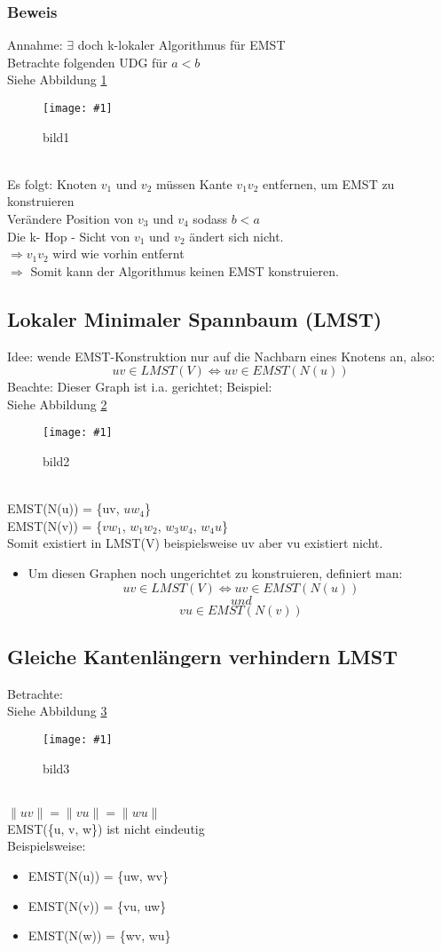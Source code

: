 \documentclass{article}
\newcommand{\bild}[4]{ %
	\begin{figure}[h!]
		\centering
		\texttt{[image: \#1]}
		\caption{#3}
		\label{#4}
	\end{figure}	
}
\newcommand{\sieheBild}[4]{
	Siehe Abbildung \ref{#4}
	\bild{#1}{#2}{#3}{#4}
}
\begin{document}
\subsubsection*{Beweis}
Annahme: $\exists$ doch k-lokaler Algorithmus für EMST\\
Betrachte folgenden UDG für $a < b$ \\
\sieheBild{Bilder/1.png}{0.7}{bild1}{Bild 1}
\\
Es folgt: Knoten $v_1$ und $v_2$ müssen Kante $v_1 v_2$ entfernen, um EMST zu konstruieren\\
Verändere Position von $v_3$ und $v_4$ sodass $b < a$\\
Die k- Hop - Sicht von $v_1$ und $v_2$ ändert sich nicht.\\
$\Rightarrow v_1 v_2$ wird wie vorhin entfernt \\
$\Rightarrow$ Somit kann der Algorithmus keinen EMST konstruieren.

\subsection*{Lokaler Minimaler Spannbaum (LMST)} 
Idee: wende EMST-Konstruktion nur auf die Nachbarn eines Knotens an, also: 
\[
	uv \in LMST(V) \Leftrightarrow uv \in EMST(N(u))
\]
Beachte: Dieser Graph ist i.a. gerichtet; Beispiel: 
\\
\sieheBild{Bilder/2.png}{0.4}{bild2}{Bild 2}
\\
EMST(N(u)) = \{uv, $uw_4$\}\\
EMST(N(v)) = \{$vw_1$, $w_1 w_2$, $w_3 w_4$, $w_4 u$\}
\\
Somit existiert in LMST(V) beispielsweise uv aber vu existiert nicht.
\begin{itemize}
	\item Um diesen Graphen noch ungerichtet zu konstruieren, definiert man: 
	\[
	uv \in LMST(V) \Leftrightarrow uv \in EMST(N(u))
	\]
	\[
	und
	\] 
	\[
	vu \in EMST(N(v))
	\]
\end{itemize}

\subsection*{Gleiche Kantenlängern verhindern LMST}
Betrachte: \\
\sieheBild{Bilder/3.png}{0.4}{bild3}{Bild 3}\\
$\|uv\| = \|vu\| = \|wu\|$
\\
EMST(\{u, v, w\}) ist nicht eindeutig
\\
Beispielsweise: 
\begin{itemize}
	\item EMST(N(u)) = \{uw, wv\}
	\item EMST(N(v)) = \{vu, uw\}
	\item EMST(N(w)) = \{wv, wu\}
\end{itemize}
\end{document}
